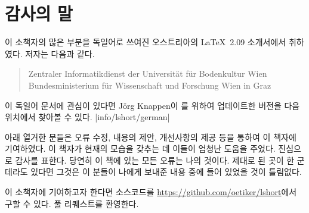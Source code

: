 \chapter{감사의 말}

\noindent 이 소책자의 많은 부분을 독일어로 쓰여진 오스트리아의 \LaTeX\ 2.09
소개서에서 취하였다. 저자는 다음과 같다.
\begin{verse}
%
{Zentraler Informatikdienst der Universit\"at f\"ur Bodenkultur Wien}
%
   {Bundesministerium f\"ur Wissenschaft und Forschung Wien}
%
   {in Graz}
\end{verse}

이 독일어 문서에 관심이 있다면 J\"org Knappen이 \LaTeXe 를 위하여 업데이트한 버전을 
다음 위치에서 찾아볼 수 있다.
\CTAN|info/lshort/german|

\newpage \noindent 
아래 열거한 분들은 오류 수정, 내용의 제안, 개선사항의 제공 등을 통하여 이 책자에
기여하였다. 이 책자가 현재의 모습을 갖추는 데 이들이 엄청난 도움을 주었다.
진심으로 감사를 표한다. 당연히 이 책에 있는 모든 오류는 나의 것이다. 제대로 된 곳이
한 군데라도 있다면 그것은 이 분들이 나에게 보내준 내용 중에 들어 있었을 것이 틀림없다.

이 소책자에 기여하고자 한다면 소스코드를 \url{https://github.com/oetiker/lshort}\allowbreak 에서 구할 수 있다. 풀 리퀘스트를 환영한다.

